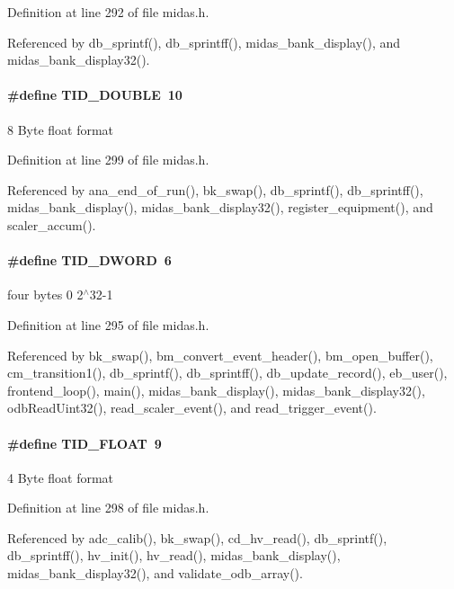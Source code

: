 Definition at line 292 of file midas.h.

Referenced by db\_\-sprintf(), db\_\-sprintff(), midas\_\-bank\_\-display(), and midas\_\-bank\_\-display32().
\paragraph[{TID\_\-DOUBLE}]{\setlength{\rightskip}{0pt plus 5cm}\#define TID\_\-DOUBLE~10}\hfill\label{group__mdefineh_ga13378fa303cf601b4b491866a6688362}
8 Byte float format 

Definition at line 299 of file midas.h.

Referenced by ana\_\-end\_\-of\_\-run(), bk\_\-swap(), db\_\-sprintf(), db\_\-sprintff(), midas\_\-bank\_\-display(), midas\_\-bank\_\-display32(), register\_\-equipment(), and scaler\_\-accum().
\paragraph[{TID\_\-DWORD}]{\setlength{\rightskip}{0pt plus 5cm}\#define TID\_\-DWORD~6}\hfill\label{group__mdefineh_gafed9e8d519719d7347f9fdb3031201d1}
four bytes 0 2$^\wedge$32-\/1 

Definition at line 295 of file midas.h.

Referenced by bk\_\-swap(), bm\_\-convert\_\-event\_\-header(), bm\_\-open\_\-buffer(), cm\_\-transition1(), db\_\-sprintf(), db\_\-sprintff(), db\_\-update\_\-record(), eb\_\-user(), frontend\_\-loop(), main(), midas\_\-bank\_\-display(), midas\_\-bank\_\-display32(), odbReadUint32(), read\_\-scaler\_\-event(), and read\_\-trigger\_\-event().
\paragraph[{TID\_\-FLOAT}]{\setlength{\rightskip}{0pt plus 5cm}\#define TID\_\-FLOAT~9}\hfill\label{group__mdefineh_gae932ec1b283f6c4b9c30a6d489beea7f}
4 Byte float format 

Definition at line 298 of file midas.h.

Referenced by adc\_\-calib(), bk\_\-swap(), cd\_\-hv\_\-read(), db\_\-sprintf(), db\_\-sprintff(), hv\_\-init(), hv\_\-read(), midas\_\-bank\_\-display(), midas\_\-bank\_\-display32(), and validate\_\-odb\_\-array().
